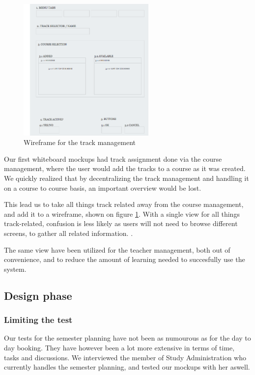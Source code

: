 \begin{figure}[htb]
\begin{center}
\leavevmode
\includegraphics[width=0.6\textwidth]{images/wireframe_tracks}
\end{center}
\caption{Wireframe for the track management}
\label{fig:wireframe_tracks}
\end{figure}

Our first whiteboard mockups had track assignment done via the course management, where the user would add the tracks to a course as it was created. We quickly realized that by decentralizing the track management and handling it on a course to course basis, an important overview would be lost.

This lead us to take all things track related away from the course management, and add it to a wireframe, shown on figure \ref{fig:wireframe_tracks}. With a single view for all things track-related, confusion is less likely as users will not need to browse different screens, to gather all related information. \cite{lauesen}.

The same view have been utilized for the teacher management, both out of convenience, and to reduce the amount of learning needed to succesfully use the system.


\subsection{Design phase}
\label{subsec:design_phase_sem}
\subsubsection{Limiting the test}
Our tests for the semester planning have not been as numourous as for the day to day booking. They have however been a lot more extensive in terms of time, tasks and discussions.
We interviewed the member of Study Administration who currently handles the semester planning, and tested our mockups with her aswell.

